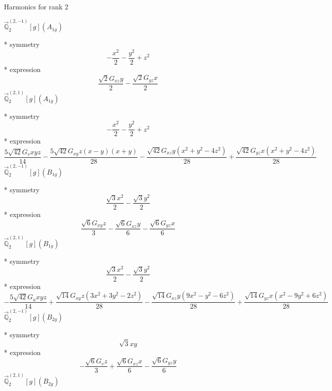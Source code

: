\documentclass[fleqn,8pt]{jsarticle}
\begin{document}
\noindent * Harmonics for rank 2

\noindent\quad $\vec{\mathbb{Q}}_{2}^{(2,-1)}[g](A_{1g})$

\noindent\quad ** symmetry
\begin{dmath*}
- \frac{x^{2}}{2} - \frac{y^{2}}{2} + z^{2}
\end{dmath*}
\noindent\quad ** expression
\begin{dmath*}
\frac{\sqrt{2} G_{xz} y}{2} - \frac{\sqrt{2} G_{yz} x}{2}
\end{dmath*}
\noindent\quad $\vec{\mathbb{Q}}_{2}^{(2,1)}[g](A_{1g})$

\noindent\quad ** symmetry
\begin{dmath*}
- \frac{x^{2}}{2} - \frac{y^{2}}{2} + z^{2}
\end{dmath*}
\noindent\quad ** expression
\begin{dmath*}
\frac{5 \sqrt{42} G_{v} x y z}{14} - \frac{5 \sqrt{42} G_{xy} z \left(x - y\right) \left(x + y\right)}{28} - \frac{\sqrt{42} G_{xz} y \left(x^{2} + y^{2} - 4 z^{2}\right)}{28} + \frac{\sqrt{42} G_{yz} x \left(x^{2} + y^{2} - 4 z^{2}\right)}{28}
\end{dmath*}
\noindent\quad $\vec{\mathbb{Q}}_{2}^{(2,-1)}[g](B_{1g})$

\noindent\quad ** symmetry
\begin{dmath*}
\frac{\sqrt{3} x^{2}}{2} - \frac{\sqrt{3} y^{2}}{2}
\end{dmath*}
\noindent\quad ** expression
\begin{dmath*}
\frac{\sqrt{6} G_{xy} z}{3} - \frac{\sqrt{6} G_{xz} y}{6} - \frac{\sqrt{6} G_{yz} x}{6}
\end{dmath*}
\noindent\quad $\vec{\mathbb{Q}}_{2}^{(2,1)}[g](B_{1g})$

\noindent\quad ** symmetry
\begin{dmath*}
\frac{\sqrt{3} x^{2}}{2} - \frac{\sqrt{3} y^{2}}{2}
\end{dmath*}
\noindent\quad ** expression
\begin{dmath*}
- \frac{5 \sqrt{42} G_{u} x y z}{14} + \frac{\sqrt{14} G_{xy} z \left(3 x^{2} + 3 y^{2} - 2 z^{2}\right)}{28} - \frac{\sqrt{14} G_{xz} y \left(9 x^{2} - y^{2} - 6 z^{2}\right)}{28} + \frac{\sqrt{14} G_{yz} x \left(x^{2} - 9 y^{2} + 6 z^{2}\right)}{28}
\end{dmath*}
\noindent\quad $\vec{\mathbb{Q}}_{2}^{(2,-1)}[g](B_{2g})$

\noindent\quad ** symmetry
\begin{dmath*}
\sqrt{3} x y
\end{dmath*}
\noindent\quad ** expression
\begin{dmath*}
- \frac{\sqrt{6} G_{v} z}{3} + \frac{\sqrt{6} G_{xz} x}{6} - \frac{\sqrt{6} G_{yz} y}{6}
\end{dmath*}
\noindent\quad $\vec{\mathbb{Q}}_{2}^{(2,1)}[g](B_{2g})$
\end{document}
